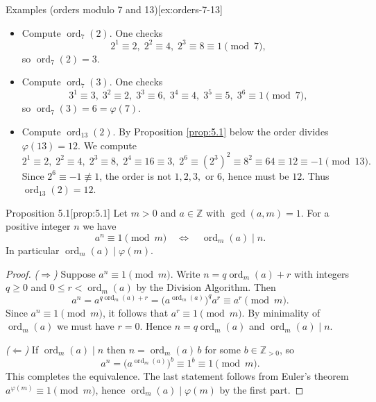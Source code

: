 \documentclass[10pt]{article}
\theoremstyle{definition}
\theoremstyle{plain}
\numberwithin{equation}{section}
\begin{document}
\begin{define}{Examples (orders modulo 7 and 13)}[ex:orders-7-13]
\begin{itemize}
  \item Compute $\operatorname{ord}_7(2)$. One checks
  \[
  2^1\equiv 2,\; 2^2\equiv 4,\; 2^3\equiv 8\equiv 1 \pmod 7,
  \]
  so $\operatorname{ord}_7(2)=3$.

  \item Compute $\operatorname{ord}_7(3)$. One checks
  \[
  3^1\equiv 3,\;3^2\equiv 2,\;3^3\equiv 6,\;3^4\equiv 4,\;3^5\equiv 5,\;3^6\equiv 1 \pmod 7,
  \]
  so $\operatorname{ord}_7(3)=6=\varphi(7)$.

  \item Compute $\operatorname{ord}_{13}(2)$. By Proposition \ref{prop:5.1} below the order divides $\varphi(13)=12$. We compute
  \[
  2^1\equiv 2,\;2^2\equiv 4,\;2^3\equiv 8,\;2^4\equiv 16\equiv 3,\;2^6\equiv (2^3)^2\equiv 8^2\equiv 64\equiv 12\equiv -1 \pmod{13}.
  \]
  Since $2^6\equiv -1\not\equiv 1$, the order is not $1,2,3,$ or $6$, hence must be $12$. Thus $\operatorname{ord}_{13}(2)=12$.
\end{itemize}
\end{define}

\bigskip

\begin{define}{Proposition 5.1}[prop:5.1]
Let $m>0$ and $a\in\mathbb{Z}$ with $\gcd(a,m)=1$. For a positive integer $n$ we have
\[
a^n\equiv 1\pmod m \quad\Longleftrightarrow\quad \operatorname{ord}_m(a)\mid n.
\]
In particular $\operatorname{ord}_m(a)\mid\varphi(m)$.
\end{define}

\begin{proof}
\emph{($\Rightarrow$)} Suppose $a^n\equiv 1\pmod m$. Write $n=q\operatorname{ord}_m(a)+r$ with integers $q\ge0$ and $0\le r<\operatorname{ord}_m(a)$ by the Division Algorithm. Then
\[
a^n = a^{q\operatorname{ord}_m(a)+r} = \bigl(a^{\operatorname{ord}_m(a)}\bigr)^q a^r \equiv a^r \pmod m.
\]
Since $a^n\equiv 1\pmod m$, it follows that $a^r\equiv 1\pmod m$. By minimality of $\operatorname{ord}_m(a)$ we must have $r=0$. Hence $n=q\operatorname{ord}_m(a)$ and $\operatorname{ord}_m(a)\mid n$.

\emph{($\Leftarrow$)} If $\operatorname{ord}_m(a)\mid n$ then $n=\operatorname{ord}_m(a)\,b$ for some $b\in\mathbb{Z}_{>0}$, so
\[
a^n=\bigl(a^{\operatorname{ord}_m(a)}\bigr)^b\equiv 1^b\equiv 1\pmod m.
\]
This completes the equivalence. The last statement follows from Euler's theorem $a^{\varphi(m)}\equiv 1\pmod m$, hence $\operatorname{ord}_m(a)\mid\varphi(m)$ by the first part.
\end{proof}
\end{document}
